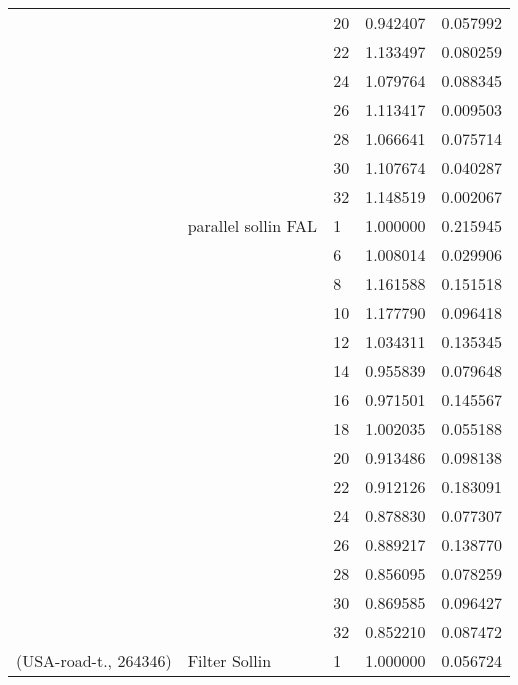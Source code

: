 \begin{tabular}{lllrr}
                      &                     & 20 &  0.942407 &  0.057992 \\
                      &                     & 22 &  1.133497 &  0.080259 \\
                      &                     & 24 &  1.079764 &  0.088345 \\
                      &                     & 26 &  1.113417 &  0.009503 \\
                      &                     & 28 &  1.066641 &  0.075714 \\
                      &                     & 30 &  1.107674 &  0.040287 \\
                      &                     & 32 &  1.148519 &  0.002067 \\
                      & parallel sollin FAL & 1  &  1.000000 &  0.215945 \\
                      &                     & 6  &  1.008014 &  0.029906 \\
                      &                     & 8  &  1.161588 &  0.151518 \\
                      &                     & 10 &  1.177790 &  0.096418 \\
                      &                     & 12 &  1.034311 &  0.135345 \\
                      &                     & 14 &  0.955839 &  0.079648 \\
                      &                     & 16 &  0.971501 &  0.145567 \\
                      &                     & 18 &  1.002035 &  0.055188 \\
                      &                     & 20 &  0.913486 &  0.098138 \\
                      &                     & 22 &  0.912126 &  0.183091 \\
                      &                     & 24 &  0.878830 &  0.077307 \\
                      &                     & 26 &  0.889217 &  0.138770 \\
                      &                     & 28 &  0.856095 &  0.078259 \\
                      &                     & 30 &  0.869585 &  0.096427 \\
                      &                     & 32 &  0.852210 &  0.087472 \\
(USA-road-t., 264346) & Filter Sollin & 1  &  1.000000 &  0.056724 \\

\end{tabular}
